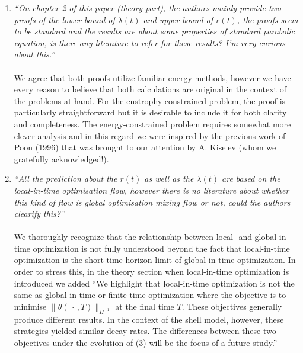 \documentclass[]{article}
\begin{document}
\begin{enumerate}
\item {\it ``On chapter 2 of this paper (theory part), the authors mainly provide two proofs of the
lower bound of  $\lambda(t)$ and upper bound of $r(t)$, the proofs seem to be standard and the results
are about some properties of standard parabolic equation, is there any literature to refer for
these results? I'm very curious about this.''} \\
\\
We agree that both proofs utilize familiar energy methods, however we have every reason to believe that both calculations are original in the context of the problems at hand. For the enstrophy-constrained problem, the proof is particularly straightforward but it is desirable to include it for both clarity and completeness. The energy-constrained problem requires somewhat more clever analysis and in this regard we were inspired by the previous work of Poon (1996) that was brought to our attention by A. Kiselev (whom we gratefully acknowledged!).  


\item {\it ``All the prediction about the $r(t)$ as well as the $\lambda(t)$ are based on the local-in-time optimisation flow, however there is no literature about whether this kind of flow is global optimisation mixing flow or not, could the authors clearify this?''} \\
\\
We thoroughly recognize that the relationship between local- and global-in-time optimization is not fully understood beyond the fact that local-in-time optimization is the short-time-horizon limit of global-in-time optimization. In order to stress this, in the theory section when local-in-time optimization is introduced we added ``We highlight that local-in-time optimization is not the same as global-in-time or finite-time optimization where the objective is to minimise $\|\theta(\,\cdot\, , T)\|_{H^{-1}}$ at the final time $T$. These objectives generally produce different results.  In the context of the shell model, however, these strategies yielded similar decay rates. The differences between these two objectives under the evolution of  (3)  will be the focus of a future study.''


\end{enumerate}
\end{document}
